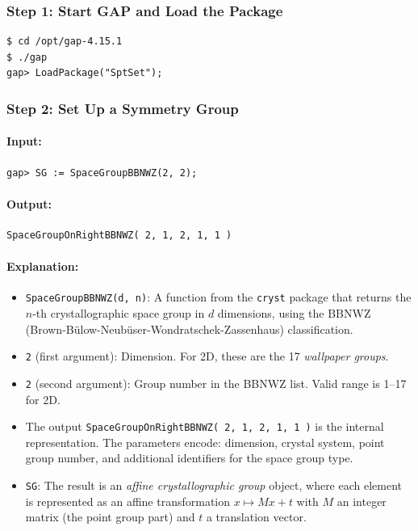 \documentclass{SciPost}
\begin{document}
\subsubsection{Step 1: Start GAP and Load the Package}
\begin{verbatim}
$ cd /opt/gap-4.15.1
$ ./gap
gap> LoadPackage("SptSet");
\end{verbatim}

\subsubsection{Step 2: Set Up a Symmetry Group}

\paragraph{Input:}
\begin{verbatim}
gap> SG := SpaceGroupBBNWZ(2, 2);
\end{verbatim}

\paragraph{Output:}
\begin{verbatim}
SpaceGroupOnRightBBNWZ( 2, 1, 2, 1, 1 )
\end{verbatim}

\paragraph{Explanation:}
\begin{itemize}
    \item \texttt{SpaceGroupBBNWZ(d, n)}: A function from the \texttt{cryst} package that returns the $n$-th crystallographic space group in $d$ dimensions, using the BBNWZ (Brown-B\"ulow-Neub\"user-Wondratschek-Zassenhaus) classification.
    \item \texttt{2} (first argument): Dimension. For 2D, these are the 17 \textit{wallpaper groups}.
    \item \texttt{2} (second argument): Group number in the BBNWZ list. Valid range is 1--17 for 2D.
    \item The output \texttt{SpaceGroupOnRightBBNWZ( 2, 1, 2, 1, 1 )} is the internal representation. The parameters encode: dimension, crystal system, point group number, and additional identifiers for the space group type.
    \item \texttt{SG}: The result is an \textit{affine crystallographic group} object, where each element is represented as an affine transformation $x \mapsto Mx + t$ with $M$ an integer matrix (the point group part) and $t$ a translation vector.
\end{itemize}
\end{document}
